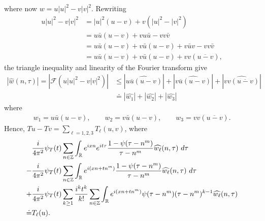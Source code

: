 \documentclass[12pt,reqno]{amsart}
\numberwithin{equation}{section}  %
\numberwithin{figure}{section}
\newcommand{\rr}{\mathbb{R}}
\newcommand{\zz}{\mathbb{Z}}
\newcommand{\wh}{\widehat}
\theoremstyle{plain}
\theoremstyle{definition}
\theoremstyle{remark}
\begin{document}
%
where now $w = u | u |^2 - v | v |^{2}$. Rewriting
%
\begin{equation*}
	\begin{split}
		u | u |^{2} - v | v |^{2}
		& = | u |^2 \left( u -v \right) + v\left( | u 
		|^2 - | v |^2
		\right)
		\\
		& = u \bar u \left( u -v \right) + v u \bar u - v v \bar v
		\\
		& = u \bar u \left( u - v \right) + v \bar u\left( u - v \right) + v 
		\bar u v - v v \bar v
		\\
		& = u \bar u \left( u -v \right) + v \bar u\left( u - v \right) + v v 
		\left( \overline{u -v} \right),
	\end{split}
\end{equation*}
%
the triangle inequality and linearity of the Fourier transform give
%
\begin{equation*}
	\begin{split}
		| \wh{w}(n, \tau) | = | \mathcal{F}(u | u |^2 - v| v |^2) |
		& \le | \wh{u \overline{u} \left (u -v \right )} | +
		| \wh{v \overline{u} (u -v)} | + |\wh{v v 
		(\overline{u-v})}|
		\\
		& \doteq | \wh{w_1} | + | \wh{w_2} | + | \wh{w_3} |
	\end{split}
\end{equation*}
%
where
%
\begin{equation*}
	\begin{split}
		w_1 = u \bar u \left( u -v \right), \qquad w_2 = v \bar u \left( u -v 
		\right), \qquad w_3 = v v \left( \overline{u -v} \right).
	\end{split}
\end{equation*}
%
Hence, $Tu - Tv = \sum_{\ell=1, 2, 3} 
T_\ell(u, v)$, where
\begin{align}
	\label{main-int-exp-mod1}
	& \frac{i}{4 \pi^2} \psi_{T}(t) \sum_{n\in \zz} \int_\rr e^{ixn}  
		e^{it \tau} \frac{ 1 - \psi(\tau - n^{m}) 
		}{\tau - n^{m}} \wh{w_\ell}(n, \tau) \ d \tau
		\\
		\label{main-int-exp-mod2}
		- & \frac{i}{4 \pi^2} \psi_{T}(t) \sum_{n\in \zz} \int_\rr e^{i(xn + 
		tn^{m})}
		 \frac{1- \psi(\tau - n^{m})}{\tau - n^{m}} \wh{w_\ell}(n, \tau) \ d \tau
		\\
		\label{main-int-exp-mod3}
		+ & \frac{i}{4 \pi^2} \psi_{T}(t) \sum_{k \ge 1} \frac{i^k t^k}{k!}
		\sum_{n \in \zz} \int_\rr e^{i(xn + tn^{m} )}
		\psi(\tau - n^{m}) (\tau - n^{m})^{k-1} \wh{w_\ell}(n, \tau)  
		\\
		\doteq & T_\ell(u). \notag
\end{align}
\end{document}

